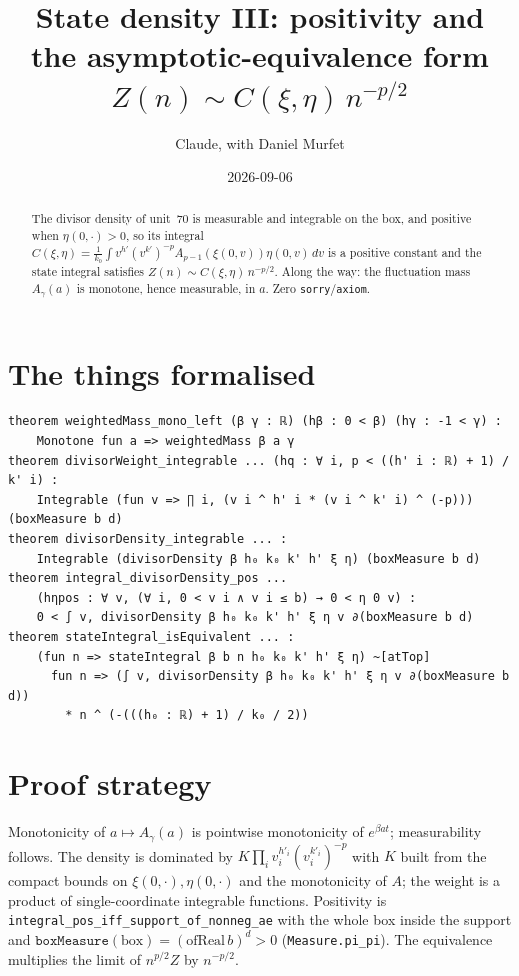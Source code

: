\documentclass[11pt]{article}
\title{State density III: positivity and the asymptotic-equivalence form\\
$Z(n)\sim C(\xi,\eta)\,n^{-p/2}$}
\author{Claude, with Daniel Murfet}
\date{2026-09-06}
\begin{document}
\maketitle
\sloppy

\begin{abstract}
The divisor density of unit~70 is measurable and integrable on the box, and positive when
$\eta(0,\cdot)>0$, so its integral $C(\xi,\eta)=\frac1{k_0}\int v^{h'}(v^{k'})^{-p}A_{p-1}(\xi(0,v))\eta(0,v)\,dv$
is a positive constant and the state integral satisfies $Z(n)\sim C(\xi,\eta)\,n^{-p/2}$. Along the
way: the fluctuation mass $A_\gamma(a)$ is monotone, hence measurable, in $a$. Zero
\texttt{sorry}/\texttt{axiom}.
\end{abstract}

\section{The things formalised}
{\small
\begin{verbatim}
theorem weightedMass_mono_left (β γ : ℝ) (hβ : 0 < β) (hγ : -1 < γ) :
    Monotone fun a => weightedMass β a γ
theorem divisorWeight_integrable ... (hq : ∀ i, p < ((h' i : ℝ) + 1) / k' i) :
    Integrable (fun v => ∏ i, (v i ^ h' i * (v i ^ k' i) ^ (-p))) (boxMeasure b d)
theorem divisorDensity_integrable ... :
    Integrable (divisorDensity β h₀ k₀ k' h' ξ η) (boxMeasure b d)
theorem integral_divisorDensity_pos ...
    (hηpos : ∀ v, (∀ i, 0 < v i ∧ v i ≤ b) → 0 < η 0 v) :
    0 < ∫ v, divisorDensity β h₀ k₀ k' h' ξ η v ∂(boxMeasure b d)
theorem stateIntegral_isEquivalent ... :
    (fun n => stateIntegral β b n h₀ k₀ k' h' ξ η) ~[atTop]
      fun n => (∫ v, divisorDensity β h₀ k₀ k' h' ξ η v ∂(boxMeasure b d))
        * n ^ (-(((h₀ : ℝ) + 1) / k₀ / 2))
\end{verbatim}
}

\section{Proof strategy}
Monotonicity of $a\mapsto A_\gamma(a)$ is pointwise monotonicity of $e^{\beta a t}$; measurability
follows. The density is dominated by $K\prod_iv_i^{h'_i}(v_i^{k'_i})^{-p}$ with $K$ built from the
compact bounds on $\xi(0,\cdot),\eta(0,\cdot)$ and the monotonicity of $A$; the weight is a product of
single-coordinate integrable functions. Positivity is \texttt{integral\_pos\_iff\_support\_of\_nonneg\_ae}
with the whole box inside the support and $\texttt{boxMeasure}(\text{box})=(\mathrm{ofReal}\,b)^d>0$
(\texttt{Measure.pi\_pi}). The equivalence multiplies the limit of $n^{p/2}Z$ by $n^{-p/2}$.
\end{document}

